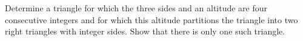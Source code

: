 Determine a triangle for which the three sides and an altitude are four consecutive integers and for which this altitude partitions the triangle into two right triangles with integer sides. Show that there is only one such triangle.